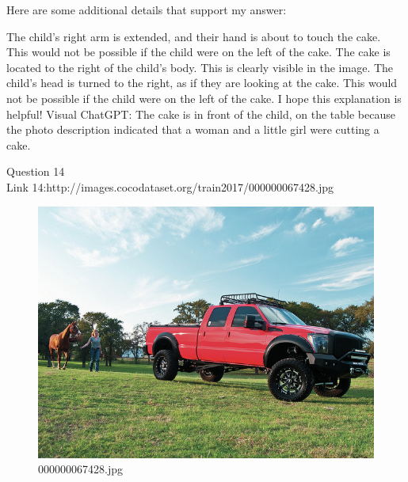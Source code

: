 \begin{enumerate}
        Here are some additional details that support my answer:

        The child's right arm is extended, and their hand is about to touch the cake. This would not be possible if the child were on the left of the cake.
        The cake is located to the right of the child's body. This is clearly visible in the image.
        The child's head is turned to the right, as if they are looking at the cake. This would not be possible if the child were on the left of the cake.
        I hope this explanation is helpful!
        \subitem Visual ChatGPT: The cake is in front of the child, on the table because the photo description indicated that a woman and a little girl were cutting a cake.
    \end{enumerate}
Question 14\\
Link 14:http://images.cocodataset.org/train2017/000000067428.jpg
    \begin{figure}[h]
        \centering
        \includegraphics[width=0.8\linewidth]{../image set/easy/000000067428.jpg}
        \caption{000000067428.jpg}
    \end{figure}
